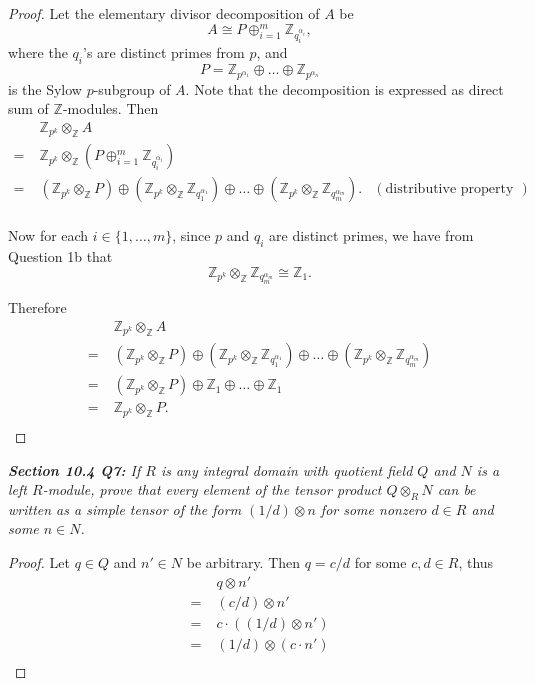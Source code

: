 \documentclass{article}
\begin{document}
  \begin{proof}
    Let the elementary divisor decomposition of $A$ be
    \[A\cong P\oplus_{i=1}^m\mathbb{Z}_{q_i^{\alpha_i}},\]
    where the $q_i$'s are distinct primes from $p$, and
    \[P=\mathbb{Z}_{p^{\alpha_1}}
    \oplus\ldots\oplus\mathbb{Z}_{p^{\alpha_n}}\]
    is the Sylow $p$-subgroup of $A$. Note that the decomposition is
    expressed as direct sum of $\mathbb{Z}$-modules. Then
    \begin{align*}
      &\;\mathbb{Z}_{p^k}\otimes_{\mathbb{Z}}A\\
      =&\;\mathbb{Z}_{p^k}\otimes_{\mathbb{Z}}
        (P\oplus_{i=1}^m \mathbb{Z}_{q_i^{\alpha_i}})\\
      =&\;(\mathbb{Z}_{p^k}\otimes_{\mathbb{Z}}P)
        \oplus(\mathbb{Z}_{p^k}
        \otimes_{\mathbb{Z}}\mathbb{Z}_{q_1^{\alpha_1}}) \oplus\ldots
        \oplus(\mathbb{Z}_{p^k}
        \otimes_{\mathbb{Z}}\mathbb{Z}_{q_m^{\alpha_m}}).
        &(\text{distributive property of tensors})\\
    \end{align*}

    Now for each $i\in\{1,\ldots,m\}$, since $p$ and $q_i$ are distinct
    primes, we have from Question 1b that
    \[\mathbb{Z}_{p^k} \otimes_{\mathbb{Z}}\mathbb{Z}_{q_m^{\alpha_m}}
    \cong\mathbb{Z}_1.\]

    Therefore
    \begin{align*}
      &\;\mathbb{Z}_{p^k}\otimes_{\mathbb{Z}}A\\
      =&\;(\mathbb{Z}_{p^k}\otimes_{\mathbb{Z}}P)
        \oplus(\mathbb{Z}_{p^k}
        \otimes_{\mathbb{Z}}\mathbb{Z}_{q_1^{\alpha_1}}) \oplus\ldots
        \oplus(\mathbb{Z}_{p^k}
        \otimes_{\mathbb{Z}}\mathbb{Z}_{q_m^{\alpha_m}})\\
      =&\;(\mathbb{Z}_{p^k}\otimes_{\mathbb{Z}}P) \oplus\mathbb{Z}_1
        \oplus\ldots \oplus\mathbb{Z}_1\\
      =&\;\mathbb{Z}_{p^k}\otimes_{\mathbb{Z}}P.\\
    \end{align*}
  \end{proof}

\it \textbf{Section 10.4 Q7:} If $R$ is any integral domain with quotient
  field $Q$ and $N$ is a left $R$-module, prove that every element of the
  tensor product $Q\otimes_R N$ can be written as a simple tensor of the
  form $(1/d)\otimes n$ for some nonzero $d\in R$ and some $n\in N$.

  \begin{proof}
    Let $q\in Q$ and $n'\in N$ be arbitrary. Then $q=c/d$ for some $c,d\in
    R$, thus
    \begin{align*}
      &\;q\otimes n'\\
      =&\;(c/d)\otimes n'\\
      =&\;c\cdot((1/d)\otimes n')\\
      =&\;(1/d)\otimes (c\cdot n')\\
    \end{align*}
  \end{proof}
\end{document}
